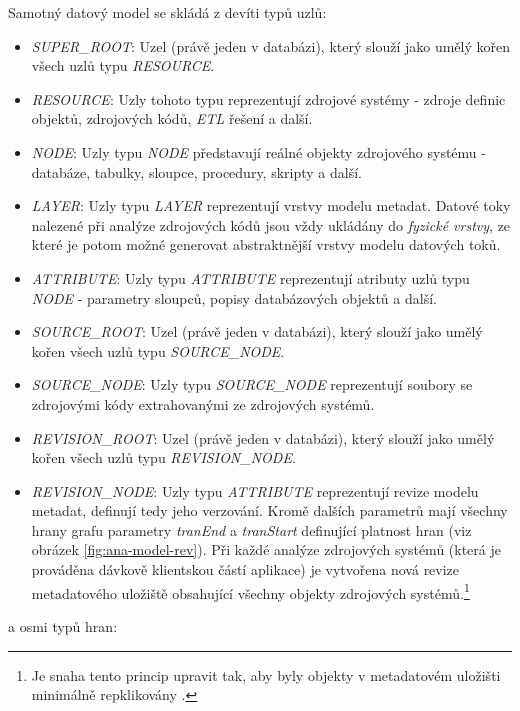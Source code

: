 Samotný datový model se skládá z devíti typů uzlů:

\begin{itemize}
	\item{\textit{SUPER\_ROOT}}: Uzel (právě jeden v databázi), který slouží jako umělý kořen všech uzlů typu \textit{RESOURCE}.
	\item{\textit{RESOURCE}}: Uzly tohoto typu reprezentují zdrojové systémy - zdroje definic objektů, zdrojových kódů, \textit{ETL} řešení a další.
	\item{\textit{NODE}}: Uzly typu \textit{NODE} představují reálné objekty zdrojového systému - databáze, tabulky, sloupce, procedury, skripty a další.
	\item{\textit{LAYER}}: Uzly typu \textit{LAYER} reprezentují vrstvy modelu metadat. Datové toky nalezené při analýze zdrojových kódů jsou vždy ukládány do \textit{fyzické vrstvy}, ze které je potom možné generovat abstraktnější vrstvy modelu datových toků.
	\item{\textit{ATTRIBUTE}}: Uzly typu \textit{ATTRIBUTE} reprezentují atributy uzlů typu \textit{NODE} - parametry sloupců, popisy databázových objektů a další.
	\item{\textit{SOURCE\_ROOT}}: Uzel (právě jeden v databázi), který slouží jako umělý kořen všech uzlů typu \textit{SOURCE\_NODE}.
	\item{\textit{SOURCE\_NODE}}: Uzly typu \textit{SOURCE\_NODE} reprezentují soubory se zdrojovými kódy extrahovanými ze zdrojových systémů.
	\item{\textit{REVISION\_ROOT}}: Uzel (právě jeden v databázi), který slouží jako umělý kořen všech uzlů typu \textit{REVISION\_NODE}.
	\item{\textit{REVISION\_NODE}}: Uzly typu \textit{ATTRIBUTE} reprezentují revize modelu metadat, definují tedy jeho verzování. Kromě dalších parametrů mají všechny hrany grafu parametry \textit{tranEnd} a \textit{tranStart} definující platnost hran (viz obrázek \ref{fig:ana-model-rev}). Při každé analýze zdrojových systémů (která je prováděna dávkově klientskou částí aplikace) je vytvořena nová revize metadatového uložiště obsahující všechny objekty zdrojových systémů.\footnote{Je snaha tento princip upravit tak, aby byly objekty v metadatovém uložišti minimálně repklikovány \cite{Sykora17}.}
\end{itemize}

 a osmi typů hran:

